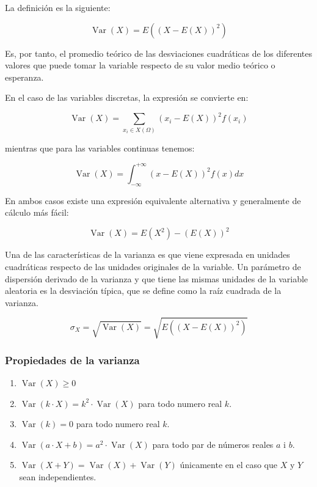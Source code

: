 \documentclass[
]{article}
\providecommand{\tightlist}{%
  \setlength{\itemsep}{0pt}\setlength{\parskip}{0pt}}
\begin{document}
La definición es la siguiente:

\[
\operatorname{Var}(X)=E\left((X-E(X))^{2}\right)
\]

Es, por tanto, el promedio teórico de las desviaciones cuadráticas de
los diferentes valores que puede tomar la variable respecto de su valor
medio teórico o esperanza.

En el caso de las variables discretas, la expresión se convierte en:

\[
\operatorname{Var}(X)=\sum_{x_{i} \in X(\Omega)}\left(x_{i}-E(X)\right)^{2} f\left(x_{i}\right)
\]

mientras que para las variables continuas tenemos:

\[
\operatorname{Var}(X)=\int_{-\infty}^{+\infty}(x-E(X))^{2} f(x) d x
\]

En ambos casos existe una expresión equivalente alternativa y
generalmente de cálculo más fácil:

\[
\operatorname{Var}(X)=E\left(X^{2}\right)-(E(X))^{2}
\]

Una de las características de la varianza es que viene expresada en
unidades cuadráticas respecto de las unidades originales de la variable.
Un parámetro de dispersión derivado de la varianza y que tiene las
mismas unidades de la variable aleatoria es la desviación típica, que se
define como la raíz cuadrada de la varianza.

\[
\sigma_{X}=\sqrt{\operatorname{Var}(X)}=\sqrt{E\left((X-E(X))^{2}\right)}
\]

\subsubsection{Propiedades de la varianza}\label{propiedades-de-la-varianza}

\begin{enumerate}
\def\labelenumi{\arabic{enumi}.}
\tightlist
\item
  \(\operatorname{Var}(X) \geq 0\)
\item
  \(\operatorname{Var}(k \cdot X)=k^{2} \cdot \operatorname{Var}(X)\)
  para todo numero real \(k\).
\item
  \(\operatorname{Var}(k)=0\) para todo numero real \(k\).
\item
  \(\operatorname{Var}(a \cdot X+b)=a^{2} \cdot \operatorname{Var}(X)\)
  para todo par de números reales \(a\) i \(b\).
\item
  \(\operatorname{Var}(X+Y)=\operatorname{Var}(X)+\operatorname{Var}(Y)\)
  únicamente en el caso que \(X\) y \(Y\) sean independientes.
\end{enumerate}
\end{document}
